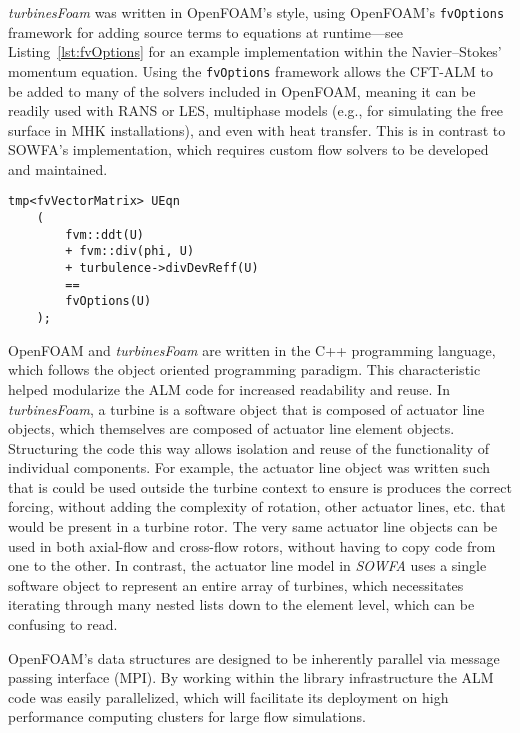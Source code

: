 \textit{turbinesFoam} was written in OpenFOAM's style, using OpenFOAM's
\texttt{fvOptions} framework for adding source terms to equations at
runtime---see Listing~\ref{lst:fvOptions} for an example implementation within
the Navier--Stokes' momentum equation. Using the \texttt{fvOptions} framework
allows the CFT-ALM to be added to many of the solvers included in OpenFOAM,
meaning it can be readily used with RANS or LES, multiphase models (e.g., for
simulating the free surface in MHK installations), and even with heat transfer.
This is in contrast to SOWFA's implementation, which requires custom flow
solvers to be developed and maintained.

\begin{lstlisting}[float,caption=Adding source terms to the momentum equation in OpenFOAM.,label=lst:fvOptions]
    tmp<fvVectorMatrix> UEqn
    (
        fvm::ddt(U)
        + fvm::div(phi, U)
        + turbulence->divDevReff(U)
        ==
        fvOptions(U)
    );
\end{lstlisting}

OpenFOAM and \textit{turbinesFoam} are written in the C++ programming language,
which follows the object oriented programming paradigm. This characteristic
helped modularize the ALM code for increased readability and reuse. In
\textit{turbinesFoam}, a turbine is a software object that is composed of
actuator line objects, which themselves are composed of actuator line element
objects. Structuring the code this way allows isolation and reuse of the
functionality of individual components. For example, the actuator line object
was written such that is could be used outside the turbine context to ensure is
produces the correct forcing, without adding the complexity of rotation, other
actuator lines, etc. that would be present in a turbine rotor. The very same
actuator line objects can be used in both axial-flow and cross-flow rotors,
without having to copy code from one to the other. In contrast, the actuator
line model in \textit{SOWFA} uses a single software object to represent an
entire array of turbines, which necessitates iterating through many nested lists
down to the element level, which can be confusing to read.

OpenFOAM's data structures are designed to be inherently parallel via message
passing interface (MPI). By working within the library infrastructure the ALM
code was easily parallelized, which will facilitate its deployment on high
performance computing clusters for large flow simulations.

